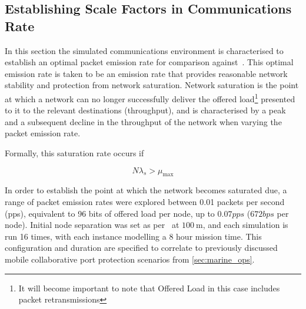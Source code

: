 \subsection{Establishing Scale Factors in Communications Rate}

In this section the simulated communications environment is characterised to establish an optimal packet emission rate for comparison against~\cite{Guo11}.
This optimal emission rate is taken to be an emission rate that provides reasonable network stability and protection from network saturation.
Network saturation is the point at which a network can no longer successfully deliver the offered load\footnote{It will become important to note that Offered Load in this case includes packet retransmissions} presented to it to the relevant destinations (throughput), and is characterised by a peak and a subsequent decline in the throughput of the network when varying the packet emission rate. 

Formally, this saturation rate occurs if

\begin{equation}
N\lambda_s>\mu_\text{max}
\end{equation}


In order to establish the point at which the network becomes saturated due, a range of packet emission rates were explored between 0.01 packets per second (pps), equivalent to 96 bits of offered load per node, up to $0.07 pps$ ($672 bps$ per node).
Initial node separation was set as per~\citet{Guo11} at $\SI{100}{\meter}$, and each simulation is run 16 times, with each instance modelling a 8 hour mission time.
This configuration and duration are specified to correlate to previously discussed mobile collaborative port protection scenarios from \autoref{sec:marine_ops}.

